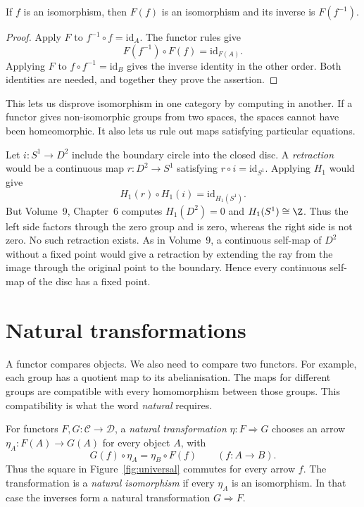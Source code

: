 \begin{proposition}\label{prop:functoriso}
If $f$ is an isomorphism, then $F(f)$ is an isomorphism and its inverse is $F(f^{-1})$.
\end{proposition}

\begin{proof}
Apply $F$ to $f^{-1}\circ f=\mathrm{id}_A$. The functor rules give
\[
F(f^{-1})\circ F(f)=\mathrm{id}_{F(A)}.
\]
Applying $F$ to $f\circ f^{-1}=\mathrm{id}_B$ gives the inverse identity in the other order. Both identities are needed, and together they prove the assertion.
\end{proof}

This lets us disprove isomorphism in one category by computing in another. If a functor gives non-isomorphic groups from two spaces, the spaces cannot have been homeomorphic. It also lets us rule out maps satisfying particular equations.

\begin{example}\label{ex:brouwer}
Let $i:S^1\to D^2$ include the boundary circle into the closed disc. A \emph{retraction} would be a continuous map $r:D^2\to S^1$ satisfying $r\circ i=\mathrm{id}_{S^1}$. Applying $H_1$ would give
\[
H_1(r)\circ H_1(i)=\mathrm{id}_{H_1(S^1)}.
\]
But Volume~9, Chapter~6 computes $H_1(D^2)=0$ and $H_1(S^1)\cong\Z$. Thus the left side factors through the zero group and is zero, whereas the right side is not zero. No such retraction exists. As in Volume~9, a continuous self-map of $D^2$ without a fixed point would give a retraction by extending the ray from the image through the original point to the boundary. Hence every continuous self-map of the disc has a fixed point.
\end{example}

\section{Natural transformations}

A functor compares objects. We also need to compare two functors. For example, each group has a quotient map to its abelianisation. The maps for different groups are compatible with every homomorphism between those groups. This compatibility is what the word \emph{natural} requires.

\begin{definition}\label{def:nat}
For functors $F,G:\mathcal C\to\mathcal D$, a \emph{natural transformation} $\eta:F\Rightarrow G$ chooses an arrow $\eta_A:F(A)\to G(A)$ for every object $A$, with
\[
G(f)\circ\eta_A=\eta_B\circ F(f)\qquad(f:A\to B).
\]
Thus the square in Figure~\ref{fig:universal} commutes for every arrow $f$. The transformation is a \emph{natural isomorphism} if every $\eta_A$ is an isomorphism. In that case the inverses form a natural transformation $G\Rightarrow F$.
\end{definition}

